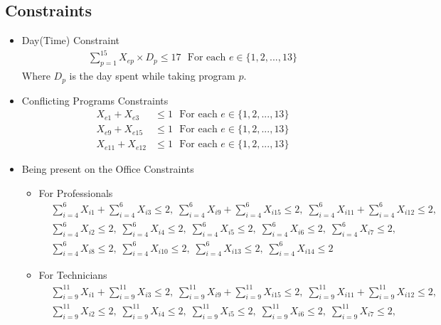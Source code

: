 \documentclass[12pt]{article}
\begin{document}
\subsection*{Constraints} 
\begin{itemize}
\item Day(Time) Constraint
\begin{align*}
    \sum_{p = 1}^{15} X_{ep} \times D_p \leq 17 \ \ \ \text{For each } e \in \{1,2, ...,13\}
\end{align*}
Where $D_p$ is the day spent while taking program $p$.
\item Conflicting Programs Constraints
\begin{align*}
X_{e1} + X_{e3} &\leq 1 \ \ \ \text{For each } e \in \{1,2,...,13\}\\
X_{e9} + X_{e15} &\leq 1 \ \ \ \text{For each } e \in \{1,2,...,13\}\\
X_{e11} + X_{e12} &\leq 1 \ \ \ \text{For each } e \in \{1,2,...,13\}
\end{align*}
\item Being present on the Office Constraints
\begin{itemize}
\item For Professionals
\begin{align*}
&\sum_{i = 4}^{6} X_{i1} + \sum_{i = 4}^{6} X_{i3} \leq 2 \text{,} \ \
\sum_{i = 4}^{6} X_{i9} + \sum_{i = 4}^{6} X_{i15} \leq 2 \text{,} \ \
\sum_{i = 4}^{6} X_{i11} + \sum_{i = 4}^{6} X_{i12} \leq 2 \text{,} \\
&\sum_{i = 4}^{6} X_{i2} \leq 2 \text{,} \ \
\sum_{i = 4}^{6} X_{i4} \leq 2  \text{,} \ \
\sum_{i = 4}^{6} X_{i5} \leq 2 \text{,} \ \
\sum_{i = 4}^{6} X_{i6} \leq 2 \text{,} \ \
\sum_{i = 4}^{6} X_{i7} \leq 2 \text{,} \\
&\sum_{i = 4}^{6} X_{i8} \leq 2 \text{,} \ \
\sum_{i = 4}^{6} X_{i10} \leq 2 \text{,} \ \
\sum_{i = 4}^{6} X_{i13} \leq 2 \text{,} \ \
\sum_{i = 4}^{6} X_{i14} \leq 2
\end{align*}
\item For Technicians
\begin{align*}
&\sum_{i = 9}^{11} X_{i1} + \sum_{i = 9}^{11} X_{i3} \leq 2 \text{,} \ \
\sum_{i = 9}^{11} X_{i9} + \sum_{i = 9}^{11} X_{i15} \leq 2 \text{,} \ \
\sum_{i = 9}^{11} X_{i11} + \sum_{i = 9}^{11} X_{i12} \leq 2 \text{,} \\
&\sum_{i = 9}^{11} X_{i2} \leq 2 \text{,} \ \
\sum_{i = 9}^{11} X_{i4} \leq 2  \text{,} \ \
\sum_{i = 9}^{11} X_{i5} \leq 2 \text{,} \ \
\sum_{i = 9}^{11} X_{i6} \leq 2 \text{,} \ \
\sum_{i = 9}^{11} X_{i7} \leq 2 \text{,} \\

\end{align*}
\end{itemize}
\end{itemize}
\end{document}
